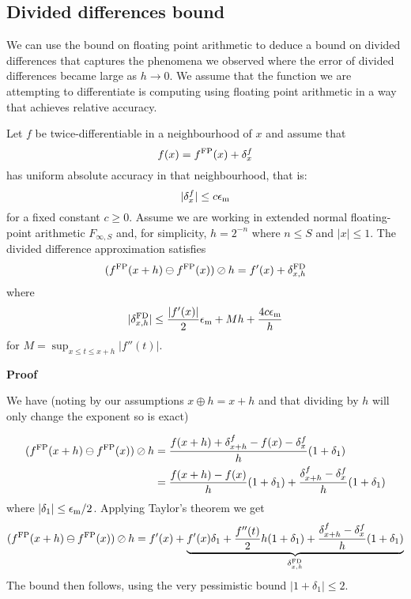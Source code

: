 \subsection{Divided differences bound}
We can use the bound on floating point arithmetic to deduce a bound on divided differences that captures the phenomena we observed where the error of divided differences became large as $h \ensuremath{\rightarrow} 0$. We assume that the function we are attempting to differentiate is computing using floating point arithmetic in a way that achieves relative accuracy. 

\begin{theorem} Let $f$ be twice-differentiable in a neighbourhood of $x$ and assume that 
\[
 f(x) = f^{\rm FP}(x) + \ensuremath{\delta}_x^f
\]
has uniform absolute accuracy in that neighbourhood, that is:
\[
|\ensuremath{\delta}_x^f| \ensuremath{\leq} c \ensuremath{\epsilon}_{\rm m}
\]
for a fixed constant $c \ensuremath{\geq} 0$.  Assume we are working in extended normal floating-point arithmetic $F_{\ensuremath{\infty},S}$ and, for simplicity, $h = 2^{-n}$ where $n \ensuremath{\leq} S$ and $|x| \ensuremath{\leq} 1$. The divided difference approximation satisfies
\[
(f^{\rm FP}(x + h) \ensuremath{\ominus} f^{\rm FP}(x)) \ensuremath{\oslash} h = f'(x) + \ensuremath{\delta}_{x,h}^{\rm FD}
\]
where 
\[
|\ensuremath{\delta}_{x,h}^{\rm FD}| \ensuremath{\leq} {|f'(x)| \over 2} \ensuremath{\epsilon}_{\rm m} + M h +  {4c \ensuremath{\epsilon}_{\rm m} \over h}
\]
for $M = \sup_{x \ensuremath{\leq} t \ensuremath{\leq} x+h} |f''(t)|$.

\end{theorem}
\textbf{Proof}

We have (noting by our assumptions $x \ensuremath{\oplus} h = x + h$ and that dividing by $h$ will only change the exponent so is exact)


\begin{align*}
(f^{\rm FP}(x + h) \ensuremath{\ominus} f^{\rm FP}(x)) \ensuremath{\oslash} h &= {f(x + h) +  \ensuremath{\delta}^f_{x+h} - f(x) - \ensuremath{\delta}^f_x \over h} (1 + \ensuremath{\delta}_1) \\
&= {f(x+h) - f(x) \over h} (1 + \ensuremath{\delta}_1) + {\ensuremath{\delta}^f_{x+h}- \ensuremath{\delta}^f_x \over h} (1 + \ensuremath{\delta}_1)
\end{align*}
where $|\ensuremath{\delta}_1| \ensuremath{\leq} {\ensuremath{\epsilon}_{\rm m} / 2}$. Applying Taylor's theorem we get 
\[
(f^{\rm FP}(x + h) \ensuremath{\ominus} f^{\rm FP}(x)) \ensuremath{\oslash} h = f'(x) + \underbrace{f'(x) \ensuremath{\delta}_1 + {f''(t) \over 2} h (1 + \delta_1) + {\ensuremath{\delta}^f_{x+h}- \ensuremath{\delta}^f_x \over h} (1 + \ensuremath{\delta}_1)}_{\ensuremath{\delta}_{x,h}^{\rm FD}}
\]
The bound then follows, using the very pessimistic bound $|1 + \ensuremath{\delta}_1| \ensuremath{\leq} 2$.

